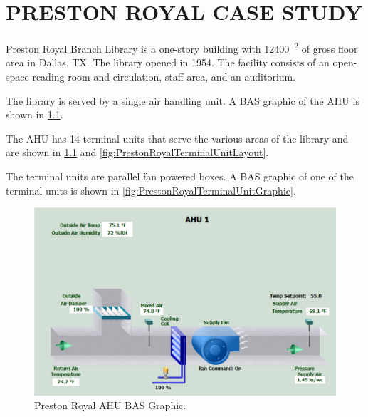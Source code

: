 \chapter{\texorpdfstring{\MakeUppercase{Preston Royal Case Study}}{Preston Royal Case Study}}

Preston Royal Branch Library is a one-story building with               
\SI{12400}{\feet\squared} of gross floor area in Dallas, TX. The        
library opened in 1954. The facility consists of an open-space reading  
room and circulation, staff area, and an auditorium.                    

The library is served by a single air handling unit. A BAS graphic of
the AHU is shown in \figref{} \ref{fig:PrestonRoyalAHUGraphic}. 

The AHU has 14 terminal units that serve the various areas of the
library and are shown in \figref{} \ref{fig:PrestonRoyalAHUGraphic} and
\ref{fig:PrestonRoyalTerminalUnitLayout}.

The terminal units are parallel fan powered boxes. A BAS graphic of one
of the terminal units is shown in \figref{}
\ref{fig:PrestonRoyalTerminalUnitGraphic}.

\begin{figure}
\centering
\includegraphics[width=\textwidth]{Images/PrestonRoyalAHUGraphic.PNG}
\caption{Preston Royal AHU BAS Graphic.}
\label{fig:PrestonRoyalAHUGraphic}
\end{figure}

